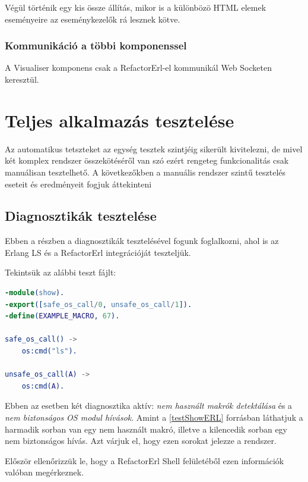 Végül történik egy kis össze állítás, mikor is a különbözö HTML elemek eseményeire az eseménykezelők rá lesznek kötve.


\subsubsection{Kommunikáció a többi komponenssel}

A Visualiser komponens csak a RefactorErl-el kommunikál Web Socketen keresztül.



\section{Teljes alkalmazás tesztelése}

Az automatikus tetszteket az egység tesztek szintjéig sikerült kivitelezni, de mivel két komplex rendszer összekötéséről van szó ezért rengeteg funkcionalitás csak manuálisan tesztelhető. A következőkben a manuális rendszer szintű tesztelés eseteit és eredményeit fogjuk áttekinteni

\subsection{Diagnosztikák tesztelése}

Ebben a részben a diagnosztikák tesztelésével fogunk foglalkozni, ahol is az Erlang LS és a RefactorErl integrációját teszteljük.

\noindent Tekintsük az alábbi teszt fájlt:

\newpage

\begin{lstlisting}[language={erlang}]  
-module(show).
-export([safe_os_call/0, unsafe_os_call/1]).
-define(EXAMPLE_MACRO, 67).

safe_os_call() ->
    os:cmd("ls").

unsafe_os_call(A) ->
    os:cmd(A).
\end{lstlisting}

Ebben az esetben két diagnosztika aktív: \textit{nem használt makrók detektálása} és a \textit{nem biztonságos OS modul hívások}. Amint a \ref{testShowERL} forrásban láthatjuk a harmadik sorban van egy nem használt makró, illetve a kilencedik sorban egy nem biztonságos hívás. Azt várjuk el, hogy ezen sorokat jelezze a rendszer.

\noindent Először ellenőrizzük le, hogy a RefactorErl Shell felületéből ezen információk valóban megérkeznek.

